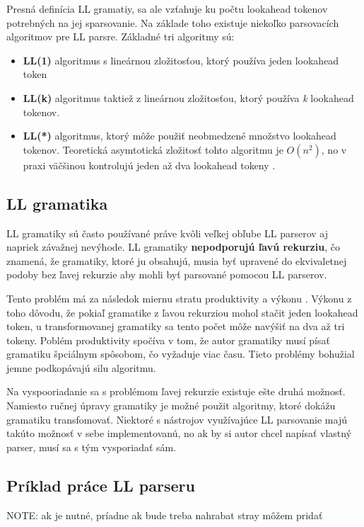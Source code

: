 Presná definícia LL gramatiy, sa ale vzťahuje ku počtu lookahead tokenov potrebných na jej sparsovanie. Na základe toho existuje niekoľko parsovacích algoritmov pre LL parsre. Základné tri algoritmy sú:
\begin{itemize}
\item \textbf{LL(1)} algoritmus s lineárnou zložitosťou, ktorý používa jeden lookahead token 
\item \textbf{LL(k)} algoritmus taktiež z lineárnou zložitosťou, ktorý používa \textit{k} lookahead tokenov.
\item \textbf{LL(*)} algoritmus, ktorý môže použiť neobmedzené množstvo lookahead tokenov. Teoretická asymtotická zložitosť tohto algoritmu je $O(n^2)$, no v praxi väčšinou kontrolujú jeden až dva lookahead tokeny \cite{LL}.
\end{itemize}

\subsection{LL gramatika}
LL gramatiky sú často používané práve kvôli veľkej obľube LL parserov aj napriek závažnej nevýhode. LL gramatiky \textbf{nepodporujú ľavú rekurziu}, čo znamená, že gramatiky, ktoré ju obsahujú, musia byť upravené do ekvivaletnej podoby bez ľavej rekurzie aby mohli byť parsované pomocou LL parserov.

Tento problém má za následok miernu stratu produktivity a výkonu \cite{tomassetti:parsing}. Výkonu z toho dôvodu, že pokiaľ gramatike z ľavou rekurziou mohol stačit jeden lookahead token, u transformovanej gramatiky sa tento počet môže navýšiť na dva až tri tokeny. Poblém produktivity spočíva v tom, že autor gramatiky musí písať gramatiku špciálnym spôsobom, čo vyžaduje viac času. Tieto problémy bohužial jemne podkopávajú silu algoritmu.

Na vyspooriadanie sa s problémom ľavej rekurzie existuje ešte druhá možnosť. Namiesto ručnej úpravy gramatiky je možné použit algoritmy, ktoré dokážu gramatiku transfomovať. Niektoré s nástrojov využívajúce LL parsovanie majú takúto možnosť v sebe implementovanú, no ak by si autor chcel napísať vlastný parser, musí sa s tým vysporiadať sám.

\subsection{Príklad práce LL parseru}
NOTE: ak je nutné, príadne ak bude treba nahrabat stray môžem pridať

